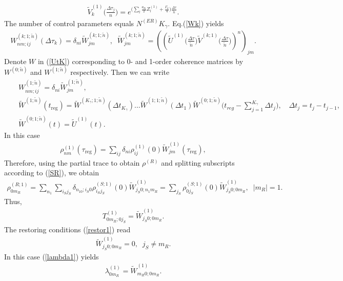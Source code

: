 \documentclass[pra,preprint,showpacs]{revtex4-1}
\begin{document}
{\begin{eqnarray}
\tilde V^{(1)}_k\Big(\frac{\Delta \tau_j}{n}\Big) = e^{\Big(\sum_l \frac{a_{lk}}{2}    Z^{(1)}_l  +\frac{\Gamma_k}{4}\Big)    \frac{\Delta \tau}{\tilde n}} .
\end{eqnarray}
The number of control parameters equals $N^{(ER)} K_\gamma$.
Eq.(\ref{Wk}) yields
\begin{eqnarray}\label{Wk2}
W^{(k;1;\tilde n)}_{nm;ij}(\Delta\tau_k) =\delta_{ni} \tilde W^{(k;1;\tilde n)}_{jm},\;\;
 \tilde W^{(k;1;\tilde n)}_{jm}=\left(\left(\tilde U^{(1)}\Big(\frac{\Delta \tau}{\tilde n}\Big) \tilde V^{(k;1)}\Big(\frac{\Delta \tau}{\tilde n}\Big)\right)^n\right)_{jm} .
\end{eqnarray}
Denote $W$ in (\ref{UtK}) corresponding to 0- and 1-order coherence matrices by $ W^{(0;\tilde n)}$ and  $ W^{(1;\tilde n)}$ respectively.
Then we can write
\begin{eqnarray}\label{UtK2}
&&
 W^{(1;\tilde n)}_{nm;ij} = \delta_{ni}  \tilde W^{(1;\tilde n)}_{jm},\\\nonumber
&&
 \tilde W^{(1;\tilde n)}(t_{\mathrm{reg}})=  \tilde W^{(K_\gamma;1;\tilde n)}(\Delta t_{K_\gamma})\dots \tilde W^{(1;1;\tilde n)} (\Delta t_1) \tilde W^{(0;1;\tilde n)}\Big(t_{reg} - \sum_{j=1}^{K_\gamma} \Delta t_j\Big) ,\quad  \Delta t_j = t_j -t_{j-1},\\\nonumber
&&
 \tilde W^{(0;1;\tilde n)}(t)= \tilde U^{(1)}(t).
\end{eqnarray}
In this case
\begin{eqnarray}
\rho^{(1)}_{nm}(\tau_{\mathrm{reg}}) = \sum_{ij} \delta_{ni}\rho^{(1)}_{ij}(0) \tilde W^{(1)}_{jm}(\tau_{\mathrm{reg}}) ,
\end{eqnarray}
Therefore, using the partial trace to obtain $\rho^{(R)}$ and splitting subscripts according to (\ref{SR}), we obtain
\begin{eqnarray}
\rho^{(R;1)}_{0m_R} =\sum_{n_1} \sum_{i_Sj_S} \delta_{n_10;i_S0}\rho^{(S;1)}_{i_Sj_S}(0) \tilde W^{(1)}_{j_S0;n_1m_R} =\sum_{j_S}\rho^{(S;1)}_{0j_S}(0) \tilde W^{(1)}_{j_S0;0m_R},\;\; |m_R|=1 .
\end{eqnarray}
Thus,
\begin{eqnarray}
T^{(1)}_{0m_R;0j_S} = \tilde W^{(1)}_{j_S0;0m_R}.
\end{eqnarray}
The restoring conditions (\ref{restor1}) read
\begin{eqnarray}
\tilde W^{(1)}_{j_S0;0m_R}=0, \;\;j_S\neq m_R .
\end{eqnarray}
In this case (\ref{lambda1}) yields
\begin{eqnarray}
\lambda^{(1)}_{0m_R} =\tilde W^{(1)}_{m_R0;0m_R}.
\end{eqnarray}

}
\end{document}
